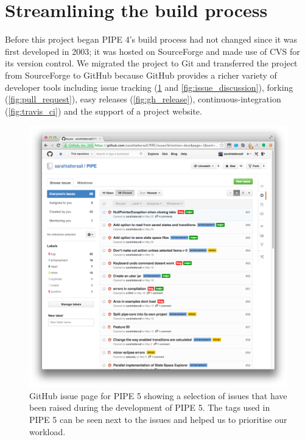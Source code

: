 \section{Streamlining the build process}
Before this project began PIPE 4's build process had not changed since it was first developed in 2003; it was hosted on SourceForge and made use of CVS for its version control. We migrated the project to Git and transferred the project from SourceForge to GitHub because GitHub provides a richer variety of developer tools including issue tracking (\cref{fig:gh_issues} and \cref{fig:issue_discussion}), forking (\cref{fig:pull_request}), easy releases (\cref{fig:gh_release}), continuous-integration (\cref{fig:travis_ci}) and the support of a project website.

\mediumlinespacing
\begin{figure}[tb]
\begin{center}
    \includegraphics[width=\linewidth]{build/gh_issues.png} 
    \caption{GitHub issue page for PIPE 5 showing a selection of issues that have been raised during the development of PIPE 5. The tags used in PIPE 5 can be seen next to the issues and helped us to prioritise our workload.}
    \label{fig:gh_issues}
\end{center}
\end{figure}

